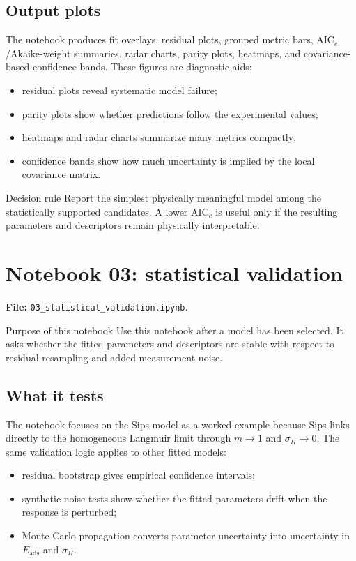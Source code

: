 \documentclass[journal=jacsat,manuscript=article]{achemso}
\begin{document}
\subsection*{Output plots}

The notebook produces fit overlays, residual plots, grouped metric bars,
AIC$_c$/Akaike-weight summaries, radar charts, parity plots, heatmaps, and
covariance-based confidence bands. These figures are diagnostic aids:
\begin{itemize}
	\item residual plots reveal systematic model failure;
	\item parity plots show whether predictions follow the experimental values;
	\item heatmaps and radar charts summarize many metrics compactly;
	\item confidence bands show how much uncertainty is implied by the local
	covariance matrix.
\end{itemize}

\begin{greenbox}{Decision rule}
	Report the simplest physically meaningful model among the statistically
	supported candidates. A lower AIC$_c$ is useful only if the resulting
	parameters and descriptors remain physically interpretable.
\end{greenbox}

\section{Notebook 03: statistical validation}
\label{app:si_notebook_03}

\noindent\textbf{File:} \texttt{03\_statistical\_validation.ipynb}.

\begin{bluebox}{Purpose of this notebook}
	Use this notebook after a model has been selected. It asks whether the
	fitted parameters and descriptors are stable with respect to residual
	resampling and added measurement noise.
\end{bluebox}

\subsection*{What it tests}

The notebook focuses on the Sips model as a worked example because Sips links
directly to the homogeneous Langmuir limit through \(m\to 1\) and
\(\sigma_H\to 0\). The same validation logic applies to other fitted models:
\begin{itemize}
	\item residual bootstrap gives empirical confidence intervals;
	\item synthetic-noise tests show whether the fitted parameters drift when
	the response is perturbed;
	\item Monte Carlo propagation converts parameter uncertainty into
	uncertainty in \(E_{\mathrm{ads}}\) and \(\sigma_H\).
\end{itemize}
\end{document}
